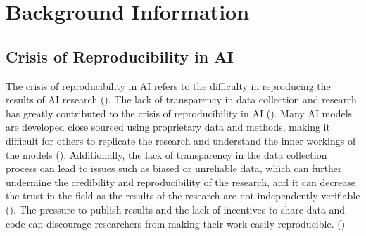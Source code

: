 \documentclass{IEEEtran}
\begin{document}

\section{Background Information}


\subsection{Crisis of Reproducibility in AI}
The crisis of reproducibility in AI refers to the difficulty in reproducing the results of AI research (\cite{gundersen2018reproducible}). The lack of transparency in data collection and research has greatly contributed to the crisis of reproducibility in AI (\cite{gundersen2018reproducible,hutson2018artificial,leakage-recrisis}). Many AI models are developed close sourced using proprietary data and methods, making it difficult for others to replicate the research and understand the inner workings of the models (\cite{gundersen2018reproducible,accountabilityInAi}). Additionally, the lack of transparency in the data collection process can lead to issues such as biased or unreliable data, which can further undermine the credibility and reproducibility of the research, and it can decrease the trust in the field as the results of the research are not independently verifiable  (\cite{accountabilityInAi,leakage-recrisis,scully-debt-ml}). The pressure to publish results and the lack of incentives to share data and code can discourage researchers from making their work easily reproducible. (\cite{psychology-reproducibility-crisis, friesike2015open,kwon2021incentive, ali2017motivating,o2017evaluation})
\end{document}
